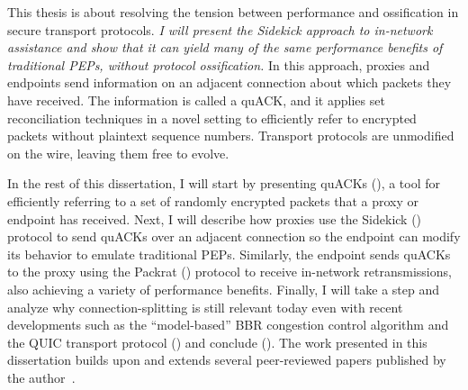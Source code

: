 This thesis is about resolving the tension between performance and ossification
in secure transport protocols. \textit{I will present the
Sidekick approach to in-network assistance and show that it can yield many of
the same performance benefits of traditional PEPs, without protocol
ossification.} In this approach, proxies and endpoints send information on an
adjacent connection about which packets they have received. The information is
called a quACK, and it applies set reconciliation techniques in a novel setting
to efficiently refer to encrypted packets without plaintext sequence numbers.
Transport protocols are unmodified on the wire, leaving them free to evolve.

In the rest of this dissertation, I will start by presenting quACKs
(), a tool for efficiently referring to a set of randomly
encrypted packets that a proxy or endpoint has received. Next, I will describe
how proxies use the Sidekick () protocol to send quACKs over
an adjacent connection so the endpoint can modify its behavior to emulate
traditional PEPs. Similarly, the endpoint sends quACKs to the proxy using the
Packrat () protocol to receive in-network retransmissions,
also achieving a variety of performance benefits. Finally, I will take a step
and analyze why connection-splitting is still relevant today even with recent
developments such as the ``model-based'' BBR congestion control algorithm and
the QUIC transport protocol () and conclude
().
The work presented in this dissertation builds upon and extends several
peer-reviewed papers published by the author~\cite{yuan2022sidecar,yuan2024sidekick,yuan2025internet}.



